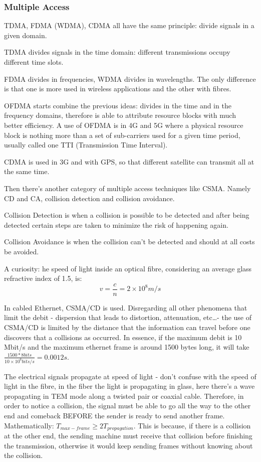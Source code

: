 \subsubsection{Multiple Access}

TDMA, FDMA (WDMA), CDMA all have the same principle: divide signals in a given domain. 

TDMA divides signals in the time domain: different transmissions occupy different time slots.

FDMA divides in frequencies, WDMA divides in wavelengths. The only difference is that one is more used in wireless applications and the other with fibres.



OFDMA starts combine the previous ideas: divides in the time and in the frequency domains, therefore is able to attribute resource blocks with much better efficiency. A use of OFDMA is in 4G and 5G where a physical resource block is nothing more than a set of sub-carriers used for a given time period, usually called one TTI (Transmission Time Interval).

CDMA is used in 3G and with GPS, so that different satellite can transmit all at the same time.

Then there's another category of multiple access techniques like CSMA. Namely CD and CA, collision detection and collision avoidance. 


Collision Detection is when a collision is possible to be detected and after being detected certain steps are taken to minimize the risk of happening again.

Collision Avoidance is when the collision can't be detected and should at all costs be avoided.

A curiosity: he speed of light inside an optical fibre, considering an average glass refractive index of 1.5, is:
\begin{equation}
    v = \frac{c}{n} = 2 \times 10^8 m/s
\end{equation}


In cabled Ethernet, CSMA/CD is used. Disregarding all other phenomena that limit the debit - dispersion that leads to distortion, attenuation, etc\dots - the use of CSMA/CD is limited by the distance that the information can travel before one discovers that a collisions as occurred. In essence, if the maximum debit is 10 Mbit/s and the maximum ethernet frame is around 1500 bytes long, it will take $\frac{1500 * 8 bits}{10 \times 10^6 bits/s} = 0.0012 s$. 

The electrical signals propagate at speed of light - don't confuse with the speed of light in the fibre, in the fiber the light is propagating in glass, here there's a wave propagating in TEM mode along a twisted pair or coaxial cable. Therefore, in order to notice a collision, the signal must be able to go all the way to the other end and comeback BEFORE the sender is ready to send another frame. Mathematically: $T_{max-frame} \geq 2 T_{propagation}$. This is because, if there is a collision at the other end, the sending machine must receive that collision before finishing the transmission, otherwise it would keep sending frames without knowing about the collision.

